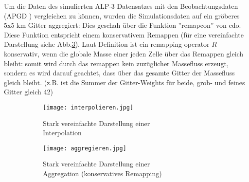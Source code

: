 Um die Daten des simulierten ALP-3 Datensatzes mit den Beobachtungsdaten (APGD \cite{meteoswiss}) vergleichen zu können, wurden die Simulationsdaten auf ein gröberes 5x5 km Gitter aggregiert: Dies geschah über die Funktion ''remapcon'' von cdo. Diese Funktion entspricht einem konservativem Remappen (für eine vereinfachte Darstellung siehe Abb.\ref{fig:aggregieren}). Laut Definition \cite{remapcon} ist ein remapping operator $R$ konservativ, wenn die globale Masse einer jeden Zelle über das Remappen gleich bleibt: somit wird durch das remappen kein zuzüglicher Massefluss erzeugt, sondern es wird darauf geachtet, dass über das gesamte Gitter der Massefluss gleich bleibt. (z.B. ist die Summer der Gitter-Weights für beide, grob- und feines Gitter gleich 42)
\begin{figure}[h]
	\begin{subfigure}{0.49\textwidth}
		\texttt{[image: interpolieren.jpg]}
		\caption{Stark vereinfachte Darstellung einer\\ Interpolation}
		\label{fig:interpolieren}
	\end{subfigure}
	\begin{subfigure}{0.49\textwidth}
		\texttt{[image: aggregieren.jpg]}
		\caption{Stark vereinfachte Darstellung einer\\ Aggregation (konservatives Remapping)}
		\label{fig:aggregieren}
	\end{subfigure}
	\caption{}
\end{figure}